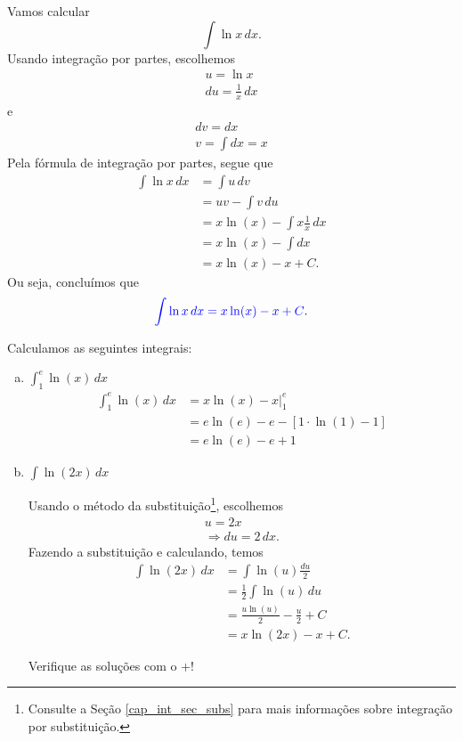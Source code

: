Vamos calcular
\begin{equation}
  \int \ln x\,dx.
\end{equation}
Usando integração por partes, escolhemos
\begin{gather}
  u = \ln x\\
  du = \frac{1}{x}\,dx
\end{gather}
e
\begin{gather}
  dv = dx\\
  v = \int dx = x
\end{gather}
Pela fórmula de integração por partes, segue que
\begin{align}
  \int \ln x \,dx &= \int u\,dv \\
                  &= uv - \int v\,du \\
                  &= x\ln(x) - \int x\frac{1}{x}\,dx \\
                  &= x\ln(x) - \int dx \\
                  &= x\ln(x) - x + C.
\end{align}
Ou seja, concluímos que
\begin{equation}\label{eq:int_lnx}
  {\color{blue}\int \ln x \,dx = x\ln(x) - x + C}.
\end{equation}

\begin{ex}
  Calculamos as seguintes integrais:
  \begin{enumerate}[a)]
  \item $\displaystyle\int_1^e\ln(x)\,dx$
    \begin{align}
      \int_1^e\ln(x)\,dx &= \left. x\ln(x) - x\right|_1^e\\
                         &= e\ln(e) - e - [1\cdot\ln(1) - 1]\\
                         &= e\ln(e) - e + 1
    \end{align}

  \item $\displaystyle\int\ln(2x)\,dx$
    
    Usando o método da substituição\footnote{Consulte a Seção \ref{cap_int_sec_subs} para mais informações sobre integração por substituição.}, escolhemos
    \begin{gather}
      u = 2x\\
      \Rightarrow du = 2\,dx.
    \end{gather}
    Fazendo a substituição e calculando, temos
    \begin{align}
      \int \ln(2x)\,dx &= \int \ln(u)\frac{du}{2} \\
                       &= \frac{1}{2}\int \ln(u)\,du \\
                       &= \frac{u\ln(u)}{2} - \frac{u}{2} + C \\
                       &= x\ln(2x) - x + C.
    \end{align}
    
  \ifispython
  Verifique as soluções com o {\python}+{\sympy}!
  \fi
  \end{enumerate}
\end{ex}

